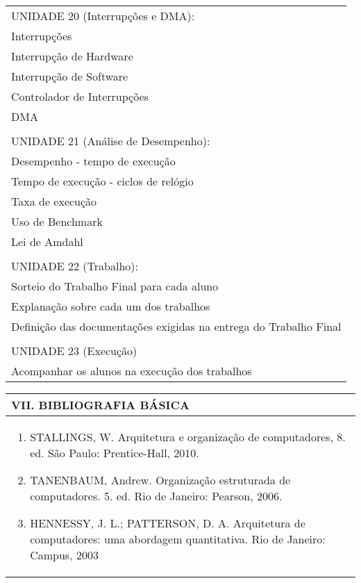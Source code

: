 \documentclass[12pt]{article}
\begin{document}
\begin{longtable}{|L{1.025\textwidth}|}
\\
UNIDADE 20 (Interrupções e DMA):\\
      Interrupções \\
      Interrupção de Hardware\\ 
      Interrupção de Software \\
      Controlador de Interrupções\\ 
      DMA\\
\\
UNIDADE 21 (Análise de Desempenho):\\
      Desempenho - tempo de execução\\
      Tempo de execução - ciclos de relógio\\ 
      Taxa de execução \\
      Uso de Benchmark \\
      Lei de Amdahl\\
      \\
UNIDADE 22 (Trabalho):\\
      Sorteio do Trabalho Final para cada aluno\\
      Explanação sobre cada um dos trabalhos\\
      Definição das documentações exigidas na entrega do Trabalho Final\\
\\
UNIDADE 23 (Execução)\\
      Acompanhar os alunos na execução dos trabalhos\\
\hline
\end{longtable} 





\begin{longtable}{|L{1.025\textwidth}|} \hline
%
{\bf VII. BIBLIOGRAFIA BÁSICA} \\ \hline
\begin{enumerate}
%
\item STALLINGS, W. Arquitetura e organização de computadores, 8. ed. São Paulo: Prentice-Hall, 2010. 
\item TANENBAUM, Andrew. Organização estruturada de computadores. 5. ed. Rio de Janeiro: Pearson, 2006. 
\item HENNESSY, J. L.; PATTERSON, D. A. Arquitetura de computadores: uma abordagem quantitativa. Rio de Janeiro: Campus, 2003
%
\end{enumerate}
 \\ \hline
\end{longtable}
\end{document}
